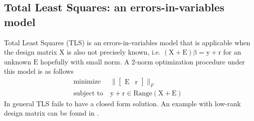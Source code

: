 \documentclass[10pt,a4paper]{article}
\newcommand{\boldvec}[1]{\boldsymbol{\mathrm{#1}}}
\let\vec\boldvec
\newcommand{\designMat}{\vec{X}} %
\newcommand{\observations}{\vec{y}} %
\newcommand{\param}{\vec{\beta}} %
\newcommand{\residual}{\vec{r}} %
\newcommand{\errorMat}{\vec{E}} %
\begin{document}
\subsection{Total Least Squares: an errors-in-variables model}

Total Least Squares (TLS) is an errors-in-variables model that is applicable when the design matrix $\designMat$ is also not precisely known,
i.e. $(\designMat + \errorMat)\param = \observations + \residual$ for an unknown $\errorMat$ hopefully with small norm. A 2-norm optimization procedure under this model is as follows
%
\begin{equation}
\begin{aligned}
\text{minimize} &\ \|\begin{bmatrix} \errorMat & \residual \end{bmatrix}\|_{F} \\
\text{subject to} &\ \observations + \residual \in \text{Range}(\designMat + \errorMat)
\end{aligned}
\end{equation}
%
In general TLS fails to have a closed form solution. An example with low-rank design matrix can be found in \cite{Golub80}. %

\end{document}
